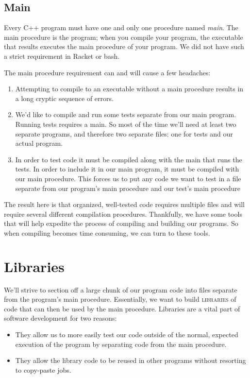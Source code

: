 \documentclass[]{tufte-handout}
\begin{document}
\subsection{Main}

Every C++ program must have one and only one procedure named \textit{main}.  The main procedure is the program; when you compile your program, the executable that results executes the main procedure of your program. We did not have such a strict requirement in Racket or bash. 

The main procedure requirement can and will cause a few headaches:
\begin{enumerate}
\item Attempting to compile to an executable without a main procedure results in a long cryptic sequence of errors.  
\item We'd like to compile and run some tests separate from our main program.  Running tests requires a main.  So most of the time we'll need at least two separate programs, and therefore two separate files: one for tests and our actual program.
\item In order to test code it must be compiled along with the main that runs the tests. In order to include it in our main program, it must be compiled with our main procedure.  This forces us to put any code we want to test in a file separate from our program's main procedure and our test's main procedure
\end{enumerate}
The result here is that organized, well-tested code requires multiple files and will require several different compilation procedures.  Thankfully, we have some tools that will help expedite the process of compiling and building our programs. So when compiling becomes time consuming, we can turn to these tools.

\section{Libraries}

We'll strive to section off a large chunk of our program code into files separate from the program's main procedure.  Essentially, we want to build \textsc{libraries} of code that can then be used by the main procedure.  Libraries are a vital part of software development for two reasons:
\begin{itemize}
\item They allow us to more easily test our code outside of the normal, expected execution of the program by separating code from the main procedure.
\item They allow the library code to be reused in other programs without resorting to copy-paste jobs.  
\end{itemize}
\end{document}
